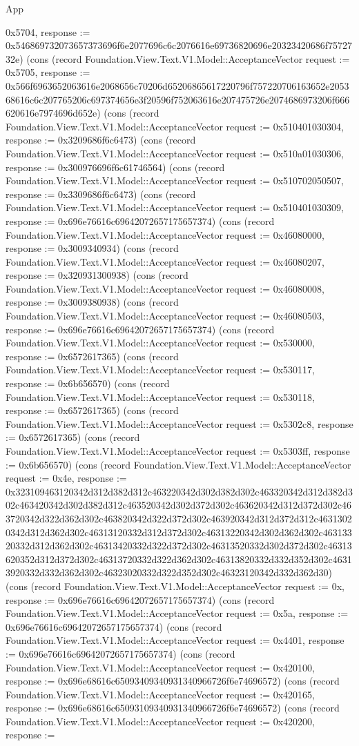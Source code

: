 \begin{lexlean}{App}
\begin{semanticmodule}
{0x5704, response := 0x546869732073657373696f6e2077696c6c2076616e69736820696e20323420686f7572732e}) (cons (record Foundation.View.Text.V1.Model::AcceptanceVector {request := 0x5705, response := 0x566f6963652063616e2068656c70206d65206865617220796f757220706163652e205368616c6c207765206c697374656e3f20596f752063616e207475726e2074686973206f666620616e7974696d652e}) (cons (record Foundation.View.Text.V1.Model::AcceptanceVector {request := 0x510401030304, response := 0x3209686f6c6473}) (cons (record Foundation.View.Text.V1.Model::AcceptanceVector {request := 0x510a01030306, response := 0x300976696f6c61746564}) (cons (record Foundation.View.Text.V1.Model::AcceptanceVector {request := 0x510702050507, response := 0x3309686f6c6473}) (cons (record Foundation.View.Text.V1.Model::AcceptanceVector {request := 0x510401030309, response := 0x696e76616c69642072657175657374}) (cons (record Foundation.View.Text.V1.Model::AcceptanceVector {request := 0x46080000, response := 0x3009340934}) (cons (record Foundation.View.Text.V1.Model::AcceptanceVector {request := 0x46080207, response := 0x320931300938}) (cons (record Foundation.View.Text.V1.Model::AcceptanceVector {request := 0x46080008, response := 0x3009380938}) (cons (record Foundation.View.Text.V1.Model::AcceptanceVector {request := 0x46080503, response := 0x696e76616c69642072657175657374}) (cons (record Foundation.View.Text.V1.Model::AcceptanceVector {request := 0x530000, response := 0x6572617365}) (cons (record Foundation.View.Text.V1.Model::AcceptanceVector {request := 0x530117, response := 0x6b656570}) (cons (record Foundation.View.Text.V1.Model::AcceptanceVector {request := 0x530118, response := 0x6572617365}) (cons (record Foundation.View.Text.V1.Model::AcceptanceVector {request := 0x5302c8, response := 0x6572617365}) (cons (record Foundation.View.Text.V1.Model::AcceptanceVector {request := 0x5303ff, response := 0x6b656570}) (cons (record Foundation.View.Text.V1.Model::AcceptanceVector {request := 0x4e, response := 0x323109463120342d312d382d312c463220342d302d382d302c463320342d312d382d302c463420342d302d382d312c463520342d302d372d302c463620342d312d372d302c463720342d322d362d302c463820342d322d372d302c463920342d312d372d312c46313020342d312d362d302c46313120332d312d372d302c46313220342d302d362d302c46313320332d312d362d302c46313420332d322d372d302c46313520332d302d372d302c46313620352d312d372d302c46313720332d322d362d302c46313820332d332d352d302c46313920332d332d362d302c46323020332d322d352d302c46323120342d332d362d30}) (cons (record Foundation.View.Text.V1.Model::AcceptanceVector {request := 0x, response := 0x696e76616c69642072657175657374}) (cons (record Foundation.View.Text.V1.Model::AcceptanceVector {request := 0x5a, response := 0x696e76616c69642072657175657374}) (cons (record Foundation.View.Text.V1.Model::AcceptanceVector {request := 0x4401, response := 0x696e76616c69642072657175657374}) (cons (record Foundation.View.Text.V1.Model::AcceptanceVector {request := 0x420100, response := 0x696e68616c65093409340931340966726f6e74696572}) (cons (record Foundation.View.Text.V1.Model::AcceptanceVector {request := 0x420165, response := 0x696e68616c65093109340931340966726f6e74696572}) (cons (record Foundation.View.Text.V1.Model::AcceptanceVector {request := 0x420200, response := }
\end{semanticmodule}
\end{lexlean}
